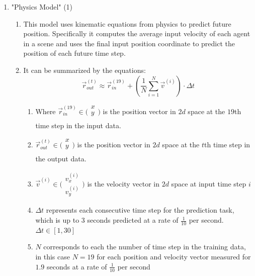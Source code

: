 \documentclass{article}
\begin{document}
      \begin{enumerate}
        \item "Physics Model" (1) 
        \label{itm:1}
        \begin{enumerate}
          \item This model uses kinematic equations from physics to predict future position. Specifically it computes the average
                input velocity of each agent in a scene and uses the final input position coordinate to predict the position of each 
                future time step.
          \item It can be summarized by the equations: 
          $$\vec{r}_{out}^{(t)} \approx \vec{r}_{in}^{(19)} + \left( \frac{1}{N}\sum_{i=1}^{N}{\vec{v}^{(i)}} \right) \cdot \Delta t$$
          \begin{enumerate}
            \item Where $\vec{r}^{(19)}_{in} \in \big( \begin{smallmatrix}
                                        x\\
                                        y\\
                                      \end{smallmatrix} \big)$
                  is the position vector in $2d$ space at the $19$th time step in the input data.
            \item $\vec{r}^{(t)}_{out} \in \big( \begin{smallmatrix}
              x\\
              y\\
            \end{smallmatrix} \big)$ is the position  vector in $2d$ space at the $t$th time step in the output data.
            \item $\vec{v}^{(i)} \in 
              \big( \begin{smallmatrix}
                v^{(i)}_{x}\\
                v^{(i)}_{y}
              \end{smallmatrix} \big)$ is the velocity vector in $2d$ space at input time step $i$
            \item $\Delta t$ represents each consecutive time step for the prediction task, which is up to 3 seconds 
                  predicted at a rate of $\frac{1}{10}$ per second. $\Delta t \in [1,30]$
            \item $N$ corresponds to each the number of time step in the training data, in this case $N=19$ for each position
                  and velocity vector measured for $1.9$ seconds at a rate of $\frac{1}{10}$ per second
          \end{enumerate}
        \end{enumerate}


\end{enumerate}
\end{document}
